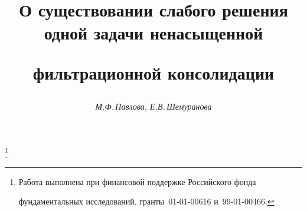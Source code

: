 




%




\newcommand{\Div}{\operatorname{div}}


\newcommand{\const}{\operatorname{const}}


\newcommand{\tts}[1]{}







\setcounter{page}{58}















\author{\it М.Ф.\,Павлова, Е.В.\,Шемуранова}




\title{О существовании слабого решения одной задачи ненасыщенной


фильтрационной консолидации}


\thanks{Работа выполнена при финансовой поддержке Российского фонда


фундаментальных исследований, гранты \No\,01-01-00616 и \No\,99-01-00466.}





\date{}




\pagestyle{plain} %







